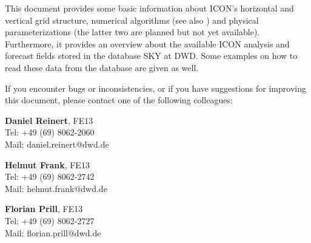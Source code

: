 This document provides some basic information about ICON's horizontal and vertical grid structure, 
numerical algorithms (see also \cite{Zaengl15}) and physical parameterizations (the latter two are 
planned but not yet available). Furthermore, it provides an overview about the available ICON analysis 
and forecast fields stored in the database SKY at DWD. Some examples on how to read these data from 
the database are given as well.

\vfill
If you encounter bugs or inconsistencies, or if you have suggestions for improving this document, 
please contact one of the following colleagues:

\begin{note}
\begin{minipage}{\textwidth}
\centering
\begin{minipage}{0.32\textwidth}
 \textbf{Daniel Reinert}, FE13 \\
 Tel: +49 (69) 8062-2060 \\ 
 Mail: daniel.reinert@dwd.de
\end{minipage}
\begin{minipage}{0.32\textwidth}
 \textbf{Helmut Frank}, FE13\\
 Tel: +49 (69) 8062-2742 \\ 
 Mail: helmut.frank@dwd.de
\end{minipage}
\begin{minipage}{0.32\textwidth}
 \textbf{Florian Prill}, FE13 \\
 Tel: +49 (69) 8062-2727 \\ 
 Mail: florian.prill@dwd.de
\end{minipage}
\end{minipage}
\end{note}  